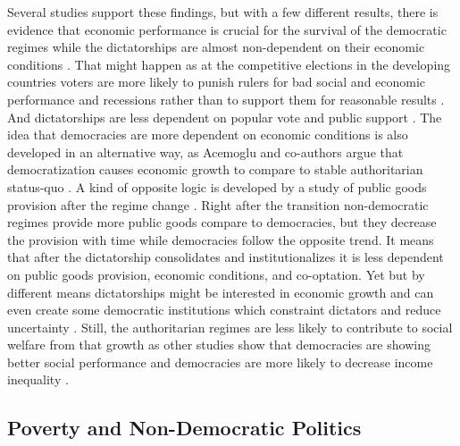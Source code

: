 \documentclass[a4paper, 12pt]{article}
\begin{document}
	Several studies support these findings, but with a few different results, there is evidence that economic performance is crucial for the survival of the democratic regimes while the dictatorships are almost non-dependent on their economic conditions \parencite{hazard_rate}. That might happen as at the competitive elections in the developing countries voters are more likely to punish rulers for bad social and economic performance and recessions rather than to support them for reasonable results \parencite{econ_vote}. And dictatorships are less dependent on popular vote and public support \parencite{inst_surv}. The idea that democracies are more dependent on economic conditions is also developed in an alternative way, as Acemoglu and co-authors argue that democratization causes economic growth to compare to stable authoritarian status-quo \parencite{democracy_growth}. A kind of opposite logic is developed by a study of public goods provision after the regime change \parencite{regime_public_goods}. Right after the transition non-democratic regimes provide more public goods compare to democracies, but they decrease the provision with time while democracies follow the opposite trend. It means that after the dictatorship consolidates and institutionalizes it is less dependent on public goods provision, economic conditions, and co-optation. Yet but by different means dictatorships might be interested in economic growth and can even create some democratic institutions which constraint dictators and reduce uncertainty \parencite{inst_constr, why_parties}. Still, the authoritarian regimes are less likely to contribute to social welfare from that growth as other studies show that democracies are showing better social performance \parencite{regime_performance} and democracies are more likely to decrease income inequality \parencite{regime_inequality}. 
	
	
	\subsection{Poverty and Non-Democratic Politics}
    
\end{document}
